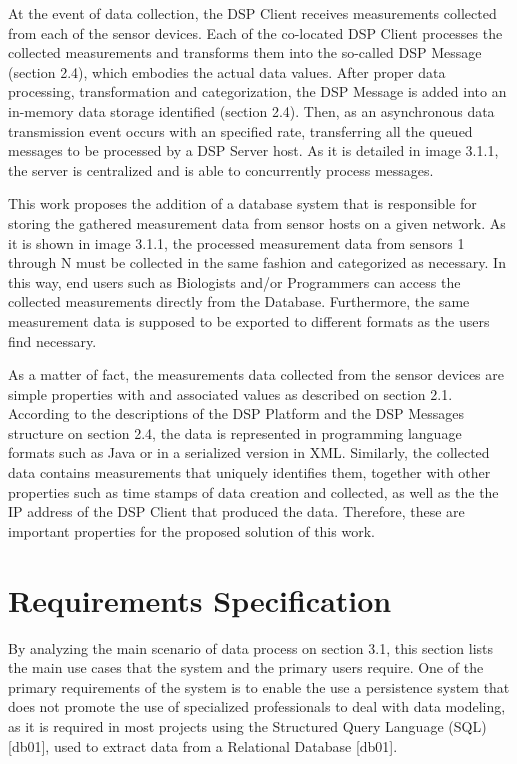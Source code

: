 At the event of data collection, the DSP Client receives measurements collected
from each of the sensor devices. Each of the co-located DSP Client processes
the collected measurements and transforms them into the so-called DSP Message
(section 2.4), which embodies the actual data values. After proper data
processing, transformation and categorization, the DSP Message is added into an
in-memory data storage identified (section 2.4). Then, as an asynchronous data
transmission event occurs with an specified rate, transferring all the queued
messages to be processed by a DSP Server host. As it is detailed in image
3.1.1, the server is centralized and is able to concurrently process messages.

This work proposes the addition of a database system that is responsible for
storing the gathered measurement data from sensor hosts on a given network. As
it is shown in image 3.1.1,  the processed measurement data from sensors 1
through N must be collected in the same fashion and categorized as necessary.
In this way, end users such as Biologists and/or Programmers can access the
collected measurements directly from the Database. Furthermore, the same
measurement data is supposed to be exported to different formats as the users
find necessary.

As a matter of fact, the measurements data collected from the sensor devices
are simple  properties with and associated values as described on section 2.1.
According to the descriptions of the DSP Platform and the DSP Messages
structure on section 2.4, the data is represented in programming language
formats such as Java or in a serialized version in XML. Similarly, the
collected data contains measurements that uniquely identifies them, together
with other properties such as time stamps of data creation and collected, as
well as the the IP address of the DSP Client that produced the data. Therefore,
these are important properties for the proposed solution of this work.

\section{Requirements Specification}

By analyzing the main scenario of data process on section 3.1, this section
lists the main use cases that the system and the primary users require. One of
the primary requirements of the system is to enable the use a persistence
system that does not promote the use of specialized professionals to deal with
data modeling, as it is required in most projects using the Structured Query
Language (SQL) [db01], used to extract data from a Relational Database [db01].

